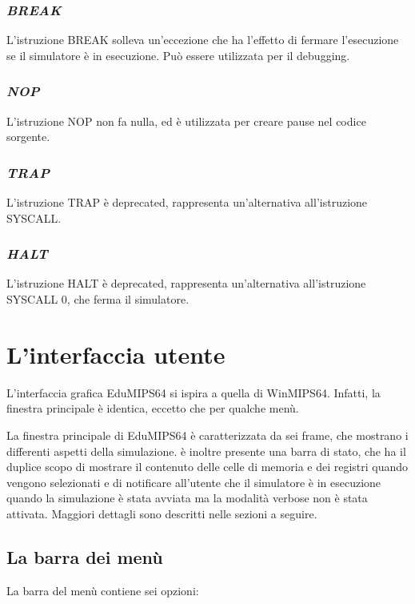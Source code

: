 \documentclass[letterpaper,10pt,english]{sphinxmanual}
\begin{document}
\subsection{\emph{BREAK}}
\label{instructions:break}
L'istruzione BREAK solleva un'eccezione che ha l'effetto di fermare
l'esecuzione se il simulatore è in esecuzione. Può essere utilizzata per
il debugging.


\subsection{\emph{NOP}}
\label{instructions:nop}
L'istruzione NOP non fa nulla, ed è utilizzata per creare pause nel codice
sorgente.


\subsection{\emph{TRAP}}
\label{instructions:trap}
L'istruzione TRAP è deprecated, rappresenta un'alternativa all'istruzione
SYSCALL.


\subsection{\emph{HALT}}
\label{instructions:halt}
L'istruzione HALT è deprecated, rappresenta un'alternativa all'istruzione
SYSCALL 0, che ferma il simulatore.


\chapter{L'interfaccia utente}
\label{user-interface:l-interfaccia-utente}\label{user-interface::doc}
L'interfaccia grafica EduMIPS64 si ispira a quella di WinMIPS64. Infatti, la
finestra principale è identica, eccetto che per qualche menù.

La finestra principale di EduMIPS64 è caratterizzata da sei frame, che
mostrano i differenti aspetti della simulazione.  è inoltre presente una
barra di stato, che ha il duplice scopo di mostrare il contenuto delle celle
di memoria e dei registri quando vengono selezionati e di notificare
all'utente che il simulatore è in esecuzione quando la simulazione è
stata avviata ma la modalità verbose  non è stata attivata.  Maggiori
dettagli sono descritti nelle sezioni a seguire.


\section{La barra dei menù}
\label{user-interface:la-barra-dei-menu}
La barra del menù contiene sei opzioni:
\end{document}
